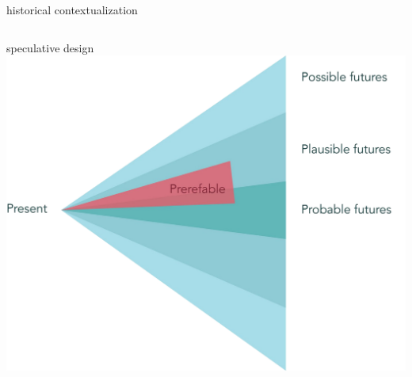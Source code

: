 \documentclass[aspectratio=43,17pt]{beamer} %
\begin{document}
\begin{frame}{historical contextualization}
{\begin{columns}
\begin{column}{0.6\textwidth}

\end{column}
\end{columns}}

\end{frame}






\begin{frame}{speculative design}
\centering
\includegraphics[height=0.9\textheight]{figures/clipart/speculative_design.png}
\end{frame}
\end{document}
